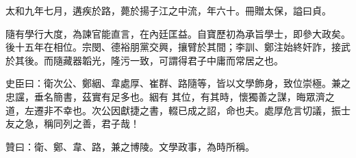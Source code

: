 \begin{pinyinscope}
 太和九年七月，遘疾於路，薨於揚子江之中流，年六十。冊贈太保，謚曰貞。



 隨有學行大度，為諫官能直言，在內廷匡益。自寶歷初為承旨學士，即參大政矣。後十五年在相位。宗閔、德裕朋黨交興，攘臂於其間；李訓、鄭注始終奸詐，接武於其後。而隨藏器韜光，隆污一致，可謂得君子中庸而常居之也。



 史臣曰：衛次公、鄭絪、韋處厚、崔群、路隨等，皆以文學飾身，致位崇極。兼之忠讜，垂名簡書，茲實有足多也。絪有
 其位，有其時，懷獨善之謀，晦眾濟之道，左遷非不幸也。次公因獻捷之書，輟已成之詔，命也夫。處厚危言切議，振士友之急，稱同列之善，君子哉！



 贊曰：衛、鄭、韋、路，兼之博陵。文學政事，為時所稱。



\end{pinyinscope}